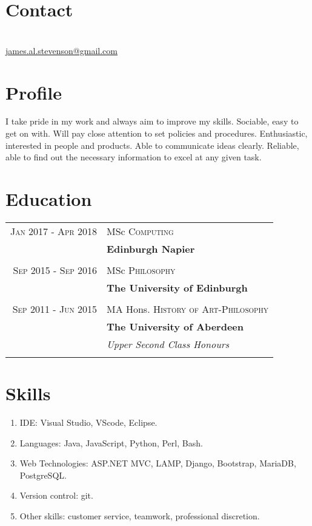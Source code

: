\documentclass[12pt, a4paper]{article}
\begin{document}
\par{\bigskip\par}
\section{Contact}
\large{}\\
\href{mailto:james.al.stevenson@gmail.com}{james.al.stevenson@gmail.com}
\section{Profile}
\large{I take pride in my work and always aim to improve my skills.  
Sociable, easy to get on with.
Will pay close attention to set policies and procedures. 
Enthusiastic, interested in people and products. 
Able to communicate ideas clearly. 
Reliable, able to find out the necessary information to excel at any given task.}
\section{Education}
\begin{tabular}{rl}	
\textsc{Jan} 2017 - \textsc{Apr} 2018 & MSc \textsc{Computing} \\
&\textbf{Edinburgh Napier}\\
\\
\textsc{Sep} 2015 - \textsc{Sep} 2016 & MSc \textsc{Philosophy} \\ 
&\textbf{The University of Edinburgh}\\
\\
\textsc{Sep} 2011 - \textsc{Jun} 2015& MA Hons. \textsc{History of Art}-\textsc{Philosophy}\\ 
&\textbf{The University of Aberdeen}\\ 
&\small\emph{Upper Second Class Honours}\\
\\
\end{tabular}  
\section{Skills}
\begin{enumerate}
\item IDE: Visual Studio, VScode, Eclipse.
\item Languages: Java, JavaScript, Python, Perl, Bash.
\item Web Technologies: ASP.NET MVC, LAMP, Django, Bootstrap, MariaDB, PostgreSQL.
\item Version control: git.
\item Other skills: customer service, teamwork, professional discretion.
\end{enumerate}
\end{document}
